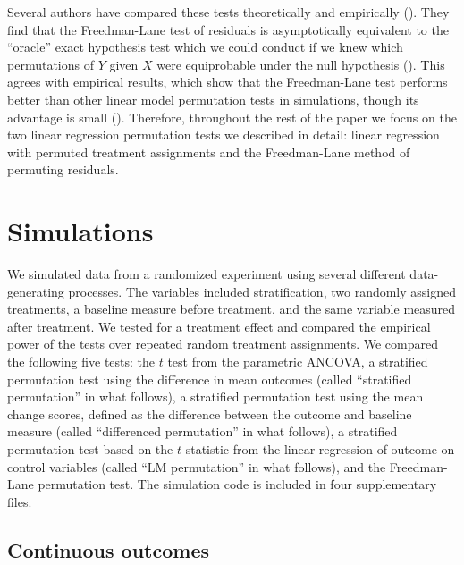 \documentclass[12pt]{article}
\begin{document}
Several authors have compared these tests theoretically and empirically (\cite{anderson_empirical_1999, anderson_permutation_2001, kennedy_randomization_1996}).
They find that the Freedman-Lane test of residuals is asymptotically equivalent to the ``oracle'' exact hypothesis test which we could conduct if we knew which permutations of $Y$ given $X$ were equiprobable under the null hypothesis (\cite{anderson_permutation_2001}).
This agrees with empirical results, which show that the Freedman-Lane test performs better than other linear model permutation tests in simulations, though its advantage is small (\cite{anderson_empirical_1999}). 
Therefore, throughout the rest of the paper we focus on the two linear regression permutation tests we described in detail: linear regression with permuted treatment assignments and the Freedman-Lane method of permuting residuals.


\section{Simulations}\label{sec:simulations}

We simulated data from a randomized experiment using several different data-generating processes.
The variables included stratification, two randomly assigned treatments, a baseline measure before treatment, and the same variable measured after treatment.
We tested for a treatment effect and compared the empirical power of the tests over repeated random treatment assignments.
We compared the following five tests:
the $t$ test from the parametric ANCOVA,
a stratified permutation test using the difference in mean outcomes
 (called ``stratified permutation'' in what follows),
a stratified permutation test using the mean change scores, defined as the difference between the outcome and baseline measure (called ``differenced permutation'' in what follows),
a stratified permutation test based on the $t$ statistic from the linear regression of outcome on control variables (called ``LM permutation'' in what follows),
and the Freedman-Lane permutation test.
The simulation code is included in four supplementary files.

\subsection{Continuous outcomes}
\end{document}

